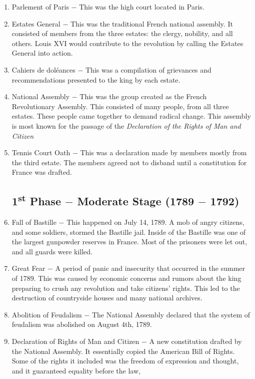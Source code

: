 \documentclass[12pt]{article}
\begin{document}
\begin{enumerate}
\item Parlement of Paris $-$ This was the high court located in Paris.

\item Estates General $-$ This was the traditional French national assembly. It consisted of members from the three estates: the clergy, nobility, and all others. Louis XVI would contribute to the revolution by calling the Estates General into action.

\item Cahiers de dol\'eances $-$ This was a compilation of grievances and recommendations presented to the king by each estate.

\item National Assembly $-$ This was the group created as the French Revolutionary Assembly. This consisted of many people, from all three estates. These people came together to demand radical change. This assembly is most known for the passage of the \textit{Declaration of the Rights of Man and Citizen}

\item Tennis Court Oath $-$ This was a declaration made by members mostly from the third estate. The members agreed not to disband until a constitution for France was drafted.

\subsection{1\textsuperscript{st} Phase $-$ Moderate Stage (1789 $-$ 1792)}

\item Fall of Bastille $-$ This happened on July 14, 1789. A mob of angry citizens, and some soldiers, stormed the Bastille jail. Inside of the Bastille was one of the largest gunpowder reserves in France. Most of the prisoners were let out, and all guards were killed.

\item Great Fear $-$ A period of panic and insecurity that occurred in the summer of 1789. This was caused by economic concerns and rumors about the king preparing to crush any revolution and take citizens' rights. This led to the destruction of countryside houses and many national archives.

\item Abolition of Feudalism $-$ The National Assembly declared that the system of feudalism was abolished on August 4th, 1789.

\item Declaration of Rights of Man and Citizen $-$ A new constitution drafted by the National Assembly. It essentially copied the American Bill of Rights. Some of the rights it included was the freedom of expression and thought, and it guaranteed equality before the law,


\end{enumerate}
\end{document}
